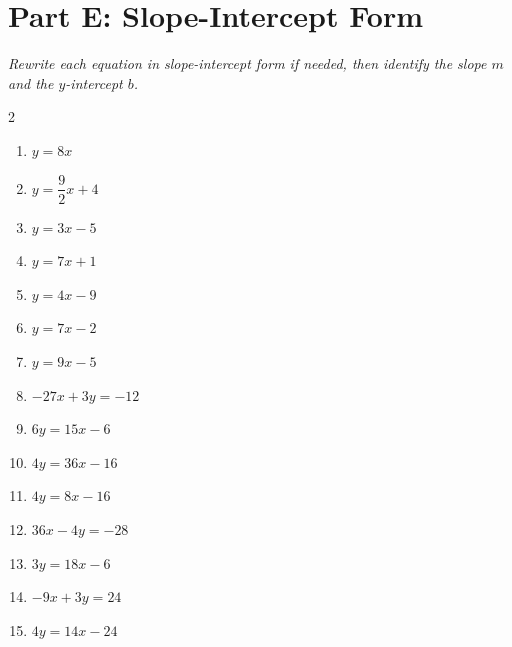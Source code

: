 \documentclass[11pt]{article}
\begin{document}
\section*{Part E: Slope-Intercept Form}
\noindent\textit{Rewrite each equation in slope-intercept form if needed, then identify the slope $m$ and the $y$-intercept $b$.}
\begin{multicols}{2}
\begin{enumerate}
  \item $y = 8x$
  \vspace{1.8cm}
  \item $y = \dfrac{9}{2}x + 4$
  \vspace{1.8cm}
  \item $y = 3x - 5$
  \vspace{1.8cm}
  \item $y = 7x + 1$
  \vspace{1.8cm}
  \item $y = 4x - 9$
  \vspace{1.8cm}
  \item $y = 7x - 2$
  \vspace{1.8cm}
  \item $y = 9x - 5$
  \vspace{1.8cm}
  \item $-27x + 3y = -12$
  \vspace{1.8cm}
  \item $6y = 15x - 6$
  \vspace{1.8cm}
  \item $4y = 36x - 16$
  \vspace{1.8cm}
  \item $4y = 8x - 16$
  \vspace{1.8cm}
  \item $36x - 4y = -28$
  \vspace{1.8cm}
  \item $3y = 18x - 6$
  \vspace{1.8cm}
  \item $-9x + 3y = 24$
  \vspace{1.8cm}
  \item $4y = 14x - 24$
  \vspace{1.8cm}
\end{enumerate}
\end{multicols}
\end{document}
